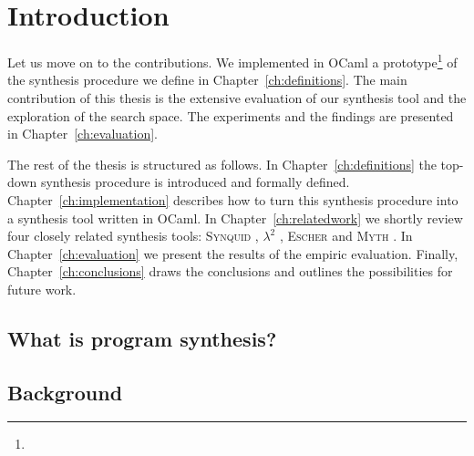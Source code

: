 \newcommand{\package}{\emph}

\chapter{Introduction}\label{ch:introduction}

Let us move on to the contributions. We implemented in OCaml a prototype\footnote{} of the synthesis procedure we define in Chapter~\ref{ch:definitions}. The main contribution of this thesis is the extensive evaluation of our synthesis tool and the exploration of the search space. The experiments and the findings are presented in Chapter~\ref{ch:evaluation}.

The rest of the thesis is structured as follows. In Chapter~\ref{ch:definitions} the top-down synthesis procedure is introduced and formally defined. Chapter~\ref{ch:implementation} describes how to turn this synthesis procedure into a synthesis tool written in OCaml. In Chapter~\ref{ch:relatedwork} we shortly review four closely related synthesis tools: \textsc{Synquid} \cite{SynquidPaper}, $\lambda^2$ \cite{LambdaSquarePaper}, \textsc{Escher} \cite{EscherPaper} and \textsc{Myth} \cite{Mythpaper}. In Chapter~\ref{ch:evaluation} we present the results of the empiric evaluation. Finally, Chapter~\ref{ch:conclusions} draws the conclusions and outlines the possibilities for future work.


\section{What is program synthesis?}

\section{Background}

